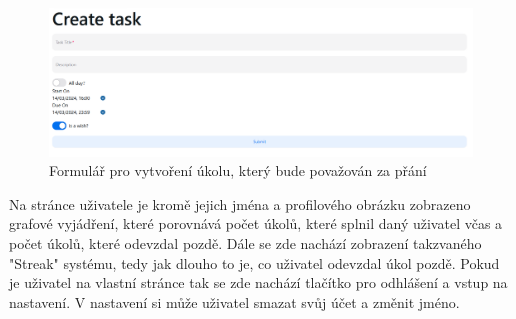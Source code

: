 \begin{figure}[hbt!]
    \centering
    \includegraphics[width=1\linewidth]{img/taskCreate.png}
    \caption{Formulář pro vytvoření úkolu, který bude považován za přání}
\end{figure}
\newpage
Na stránce uživatele je kromě jejich jména a profilového obrázku zobrazeno grafové vyjádření, které porovnává počet úkolů, které splnil daný uživatel včas a počet úkolů, které odevzdal pozdě. Dále se zde nachází zobrazení takzvaného "Streak" systému, tedy jak dlouho to je, co uživatel odevzdal úkol pozdě. Pokud je uživatel na vlastní stránce tak se zde nachází tlačítko pro odhlášení a vstup na nastavení. V nastavení si může uživatel smazat svůj účet a změnit jméno.

